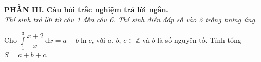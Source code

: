 \documentclass[12pt,a4paper]{article}
\begin{document}
\begin{center}
\noindent\textbf{\large PHẦN III. Câu hỏi trắc nghiệm trả lời ngắn.}
\\ \textit{Thí sinh trả lời từ câu 1 đến câu 6. Thí sinh điền đáp số vào ô trống tương ứng.}
\end{center}
\setcounter{ex}{0}

\begin{ex}%
 Cho $\displaystyle\int\limits_{1}^{3} \dfrac{x+2}{x} \mathrm{\,d}x=a+ b \ln c$, với $a$, $b$, $c \in \mathbb{Z}$ và $b$ là số nguyên tố. Tính tổng $S=a+b+c$.
 \par
 
\end{ex}
\end{document}
